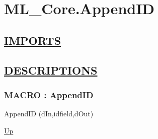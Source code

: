 \chapter*{ML\_Core.AppendID}
\hypertarget{ecldoc:toc:ML_Core.AppendID}{}

\section*{\underline{IMPORTS}}

\section*{\underline{DESCRIPTIONS}}
\subsection*{MACRO : AppendID}
\hypertarget{ecldoc:ml_core.appendid}{}
\begin{minipage}[t]{\textwidth}
\begin{flushleft}
 AppendID (dIn,idfield,dOut)
\end{flushleft}
\end{minipage}
\hyperlink{ecldoc:toc:ML_Core}{Up}

\par
\par
